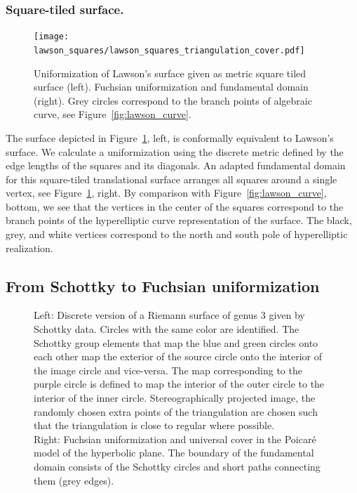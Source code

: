 \documentclass[Thesis.tex]{subfiles}
\begin{document}
\subsubsection{Square-tiled surface.}

\begin{figure}
	\centering
	\resizebox{!}{6cm} {
	\texttt{[image: lawson\_squares/lawson\_squares\_triangulation\_cover.pdf]}
	}
	\caption{Uniformization of Lawson's surface given as metric square tiled surface (left). Fuchsian
uniformization and fundamental domain (right). Grey circles correspond to the branch points of algebraic curve, see Figure~\ref{fig:lawson_curve}.}
\label{fig:lawson_squares}
\end{figure}

The surface depicted in Figure~\ref{fig:lawson_squares}, left, is conformally equivalent to Lawson's surface. We calculate a uniformization using the discrete metric defined by the edge lengths of the squares and its diagonals. An adapted fundamental domain for this square-tiled translational surface arranges all squares around a single vertex, see Figure~\ref{fig:lawson_squares}, right. By comparison with Figure~\ref{fig:lawson_curve}, bottom, we see that the vertices in the center of the squares correspond to the branch points of the hyperelliptic curve representation of the surface. The black, grey, and white vertices correspond to the north and south pole of hyperelliptic realization.


\subsection{From Schottky to Fuchsian uniformization}

\begin{figure}
\centering
{}
\caption{
Left: Discrete version of a Riemann surface of genus $3$ given by Schottky data.
Circles with the same color are identified.
The Schottky group elements that map the blue and green circles onto each other map the exterior of the source circle onto the interior of the image circle and vice-versa.
The map corresponding to the purple circle is defined to map the interior of the outer circle to the interior of the inner circle. Stereographically projected image, the randomly chosen extra points of the triangulation are chosen such that the triangulation is close to regular where possible.
\\
Right: Fuchsian uniformization and universal cover in the Poicar\'e model of the hyperbolic plane. The boundary of the fundamental domain consists of  the Schottky circles and short paths connecting them (grey edges).}
\end{figure}
\end{document}
